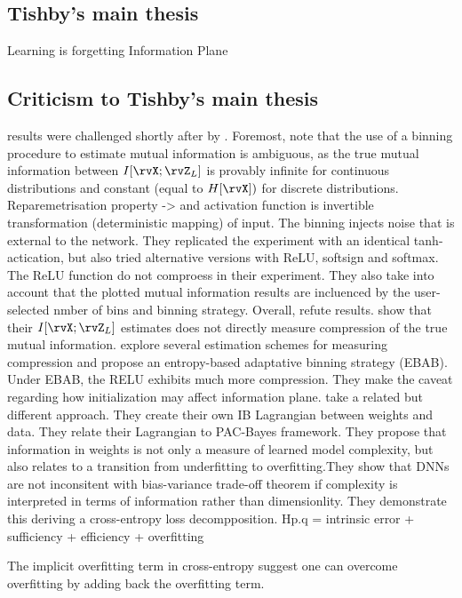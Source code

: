 \subsection{Tishby's main thesis}
Learning is forgetting
Information Plane
\subsection{Criticism to Tishby's main thesis}\label{sec:criticsm}
\citeauthor{shwartz-ziv:2017} results were challenged shortly after by \cite{saxe:2018}. Foremost, \citeauthor{saxe:2018} note that the use of a binning procedure to estimate mutual information is ambiguous, as the true mutual information between $I[\rvX;\rvZ_L]$ is provably infinite for continuous distributions and constant (\ie equal to $H[\rvX])$ for discrete distributions. Reparemetrisation property -> and activation function is invertible transformation (deterministic mapping) of input. The binning injects noise that is external to the network. They replicated the experiment with an identical tanh-actication, but also tried alternative versions with ReLU, softsign and softmax. The ReLU function do not comproess in their experiment. They also take into account that the plotted mutual information results are incluenced by the user-selected nmber of bins and binning strategy. Overall, \citeauthor{saxe:2018} refute \citeauthor{shwartz-ziv:2017} results.
\cite{goldfeld:2019} show that their $I[\rvX;\rvZ_L]$ estimates does not directly measure compression of the true mutual information.
\cite{chelombiev:2018} explore several estimation schemes for measuring compression and propose an entropy-based adaptative binning strategy (EBAB). Under EBAB, the RELU exhibits much more compression. They make the caveat regarding how initialization may affect information plane.
\citeauthor{achille:2017emergence} take a related but different approach. They create their own IB Lagrangian between weights and data. They relate their Lagrangian to PAC-Bayes framework. They propose that information in weights is not only a measure of learned model complexity, but also relates to a transition from underfitting to overfitting.They show that DNNs are not inconsitent with bias-variance trade-off theorem if complexity is interpreted in terms of information rather than dimensionlity. They demonstrate this deriving a cross-entropy loss decompposition.
Hp.q = intrinsic error + sufficiency + efficiency + overfitting

The implicit overfitting term in cross-entropy suggest one can overcome overfitting by adding back the overfitting term.


